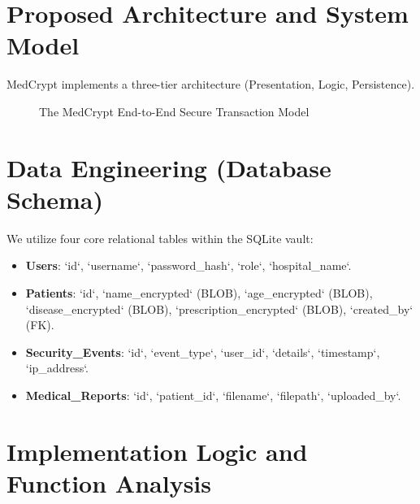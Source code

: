 \documentclass[conference,onecolumn]{IEEEtran}
\begin{document}
\section{Proposed Architecture and System Model}
MedCrypt implements a three-tier architecture (Presentation, Logic, Persistence).

\begin{figure}[h]
\centering
{}
\caption{The MedCrypt End-to-End Secure Transaction Model}
\end{figure}

\section{Data Engineering (Database Schema)}
We utilize four core relational tables within the SQLite vault:
\begin{itemize}
    \item \textbf{Users}: `id`, `username`, `password_hash`, `role`, `hospital_name`.
    \item \textbf{Patients}: `id`, `name_encrypted` (BLOB), `age_encrypted` (BLOB), `disease_encrypted` (BLOB), `prescription_encrypted` (BLOB), `created_by` (FK).
    \item \textbf{Security\_Events}: `id`, `event_type`, `user_id`, `details`, `timestamp`, `ip_address`.
    \item \textbf{Medical\_Reports}: `id`, `patient_id`, `filename`, `filepath`, `uploaded_by`.
\end{itemize}

\section{Implementation Logic and Function Analysis}
\end{document}

